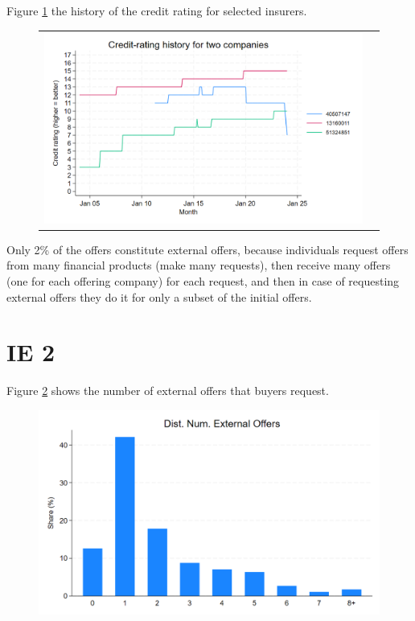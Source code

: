 \documentclass[12pt]{article}
\begin{document}
Figure \ref{fig:ie1_1} the history of the credit rating for selected insurers.  
\begin{figure}[H]
\caption{}
 \label{fig:ie1_1}
\centering{}%
\begin{tabular}{cc}
\includegraphics[scale=0.27]{figures/IE1_credit_history.png}
\end{tabular}
\end{figure}

Only 2\% of the offers constitute external offers, because individuals request offers from many financial products (make many requests), then receive many offers (one for each offering company) for each request, and then in case of requesting external offers they do it for only a subset of the initial offers. 

\section{IE 2}

Figure \ref{fig:ie2_1} shows the number of external offers that buyers request.

\begin{figure}[H]
\caption{}
\label{fig:ie2_1}
\centering{}%
\includegraphics[scale=0.27]{figures/IE2_dist_external_offers.png}
\end{figure}
\end{document}
